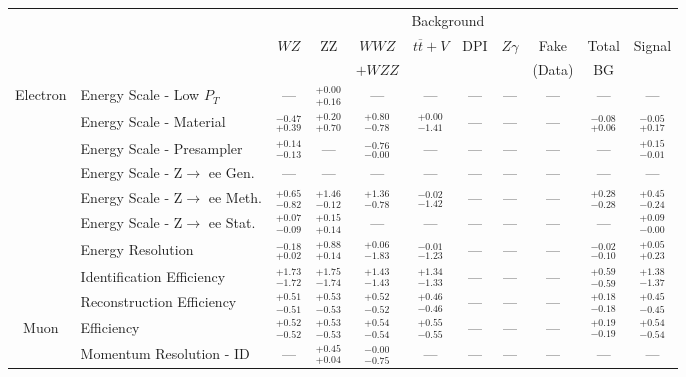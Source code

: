 \small\renewcommand{\tabcolsep}{1pt}
\begin{tabular}{|cl||ccccccc|c||c|}
\hline
 & & \multicolumn{8}{c||}{Background} & \\ 
 & & $WZ$ & ZZ & $WWZ$ & $t\overline{t}+V$ & DPI & $Z\gamma$ & Fake & Total & Signal\\ 
 & & &  & $+WZZ$ &  &  &  & (Data) & BG & \\ 
\hline\hline
\multirow{9}{*}{Electron}
&Energy Scale - Low $P_{T}$ & --- &  $^{+0.00}_{+0.16}$  & --- & --- & --- & --- & --- & --- & ---\\ 
\cline{2-11}
&Energy Scale - Material &  $^{-0.47}_{+0.39}$  &  $^{+0.20}_{+0.70}$  &  $^{+0.80}_{-0.78}$  &  $^{+0.00}_{-1.41}$  & --- & --- & --- &  $^{-0.08}_{+0.06}$  &  $^{-0.05}_{+0.17}$ \\ 
\cline{2-11}
&Energy Scale - Presampler &  $^{+0.14}_{-0.13}$  & --- &  $^{-0.76}_{-0.00}$  & --- & --- & --- & --- & --- &  $^{+0.15}_{-0.01}$ \\ 
\cline{2-11}
&Energy Scale - Z$\rightarrow$ ee Gen. & --- & --- & --- & --- & --- & --- & --- & --- & ---\\ 
\cline{2-11}
&Energy Scale - Z$\rightarrow$ ee Meth. &  $^{+0.65}_{-0.82}$  &  $^{+1.46}_{-0.12}$  &  $^{+1.36}_{-0.78}$  &  $^{-0.02}_{-1.42}$  & --- & --- & --- &  $^{+0.28}_{-0.28}$  &  $^{+0.45}_{-0.24}$ \\ 
\cline{2-11}
&Energy Scale - Z$\rightarrow$ ee Stat. &  $^{+0.07}_{-0.09}$  &  $^{+0.15}_{+0.14}$  & --- & --- & --- & --- & --- & --- &  $^{+0.09}_{-0.00}$ \\ 
\cline{2-11}
&Energy Resolution &  $^{-0.18}_{+0.02}$  &  $^{+0.88}_{+0.14}$  &  $^{+0.06}_{-1.83}$  &  $^{-0.01}_{-1.23}$  & --- & --- & --- &  $^{-0.02}_{-0.10}$  &  $^{+0.05}_{+0.23}$ \\ 
\cline{2-11}
&Identification Efficiency &  $^{+1.73}_{-1.72}$  &  $^{+1.75}_{-1.74}$  &  $^{+1.43}_{-1.43}$  &  $^{+1.34}_{-1.33}$  & --- & --- & --- &  $^{+0.59}_{-0.59}$  &  $^{+1.38}_{-1.37}$ \\ 
\cline{2-11}
&Reconstruction Efficiency &  $^{+0.51}_{-0.51}$  &  $^{+0.53}_{-0.53}$  &  $^{+0.52}_{-0.52}$  &  $^{+0.46}_{-0.46}$  & --- & --- & --- &  $^{+0.18}_{-0.18}$  &  $^{+0.45}_{-0.45}$ \\ 
\hline
\multirow{4}{*}{Muon}
&Efficiency &  $^{+0.52}_{-0.52}$  &  $^{+0.53}_{-0.53}$  &  $^{+0.54}_{-0.54}$  &  $^{+0.55}_{-0.55}$  & --- & --- & --- &  $^{+0.19}_{-0.19}$  &  $^{+0.54}_{-0.54}$ \\ 
\cline{2-11}
&Momentum Resolution - ID & --- &  $^{+0.45}_{+0.04}$  &  $^{-0.00}_{-0.75}$  & --- & --- & --- & --- & --- & ---\\ 

\end{tabular}
